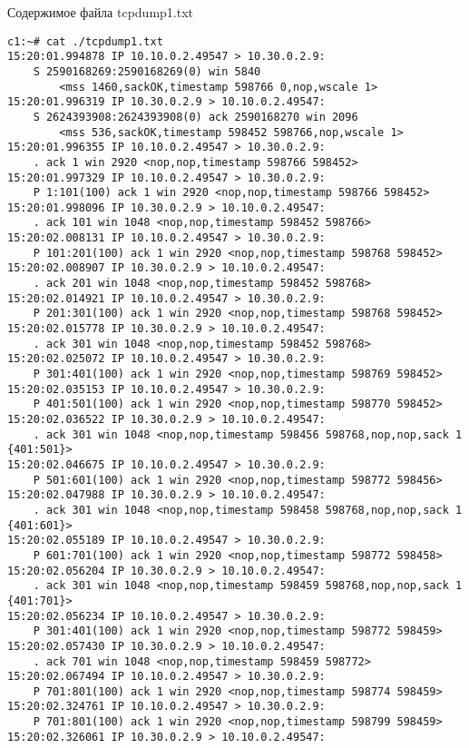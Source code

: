 \documentclass[a4paper,12pt]{article}
\begin{document}
Содержимое файла tcpdump1.txt
\begin{Verbatim}
c1:~# cat ./tcpdump1.txt 
15:20:01.994878 IP 10.10.0.2.49547 > 10.30.0.2.9: 
    S 2590168269:2590168269(0) win 5840 
        <mss 1460,sackOK,timestamp 598766 0,nop,wscale 1>
15:20:01.996319 IP 10.30.0.2.9 > 10.10.0.2.49547: 
    S 2624393908:2624393908(0) ack 2590168270 win 2096 
        <mss 536,sackOK,timestamp 598452 598766,nop,wscale 1>
15:20:01.996355 IP 10.10.0.2.49547 > 10.30.0.2.9: 
    . ack 1 win 2920 <nop,nop,timestamp 598766 598452>
15:20:01.997329 IP 10.10.0.2.49547 > 10.30.0.2.9: 
    P 1:101(100) ack 1 win 2920 <nop,nop,timestamp 598766 598452>
15:20:01.998096 IP 10.30.0.2.9 > 10.10.0.2.49547: 
    . ack 101 win 1048 <nop,nop,timestamp 598452 598766>
15:20:02.008131 IP 10.10.0.2.49547 > 10.30.0.2.9: 
    P 101:201(100) ack 1 win 2920 <nop,nop,timestamp 598768 598452>
15:20:02.008907 IP 10.30.0.2.9 > 10.10.0.2.49547: 
    . ack 201 win 1048 <nop,nop,timestamp 598452 598768>
15:20:02.014921 IP 10.10.0.2.49547 > 10.30.0.2.9: 
    P 201:301(100) ack 1 win 2920 <nop,nop,timestamp 598768 598452>
15:20:02.015778 IP 10.30.0.2.9 > 10.10.0.2.49547: 
    . ack 301 win 1048 <nop,nop,timestamp 598452 598768>
15:20:02.025072 IP 10.10.0.2.49547 > 10.30.0.2.9: 
    P 301:401(100) ack 1 win 2920 <nop,nop,timestamp 598769 598452>
15:20:02.035153 IP 10.10.0.2.49547 > 10.30.0.2.9: 
    P 401:501(100) ack 1 win 2920 <nop,nop,timestamp 598770 598452>
15:20:02.036522 IP 10.30.0.2.9 > 10.10.0.2.49547: 
    . ack 301 win 1048 <nop,nop,timestamp 598456 598768,nop,nop,sack 1 {401:501}>
15:20:02.046675 IP 10.10.0.2.49547 > 10.30.0.2.9: 
    P 501:601(100) ack 1 win 2920 <nop,nop,timestamp 598772 598456>
15:20:02.047988 IP 10.30.0.2.9 > 10.10.0.2.49547: 
    . ack 301 win 1048 <nop,nop,timestamp 598458 598768,nop,nop,sack 1 {401:601}>
15:20:02.055189 IP 10.10.0.2.49547 > 10.30.0.2.9: 
    P 601:701(100) ack 1 win 2920 <nop,nop,timestamp 598772 598458>
15:20:02.056204 IP 10.30.0.2.9 > 10.10.0.2.49547: 
    . ack 301 win 1048 <nop,nop,timestamp 598459 598768,nop,nop,sack 1 {401:701}>
15:20:02.056234 IP 10.10.0.2.49547 > 10.30.0.2.9: 
    P 301:401(100) ack 1 win 2920 <nop,nop,timestamp 598772 598459>
15:20:02.057430 IP 10.30.0.2.9 > 10.10.0.2.49547: 
    . ack 701 win 1048 <nop,nop,timestamp 598459 598772>
15:20:02.067494 IP 10.10.0.2.49547 > 10.30.0.2.9: 
    P 701:801(100) ack 1 win 2920 <nop,nop,timestamp 598774 598459>
15:20:02.324761 IP 10.10.0.2.49547 > 10.30.0.2.9: 
    P 701:801(100) ack 1 win 2920 <nop,nop,timestamp 598799 598459>
15:20:02.326061 IP 10.30.0.2.9 > 10.10.0.2.49547: 

\end{Verbatim}
\end{document}
